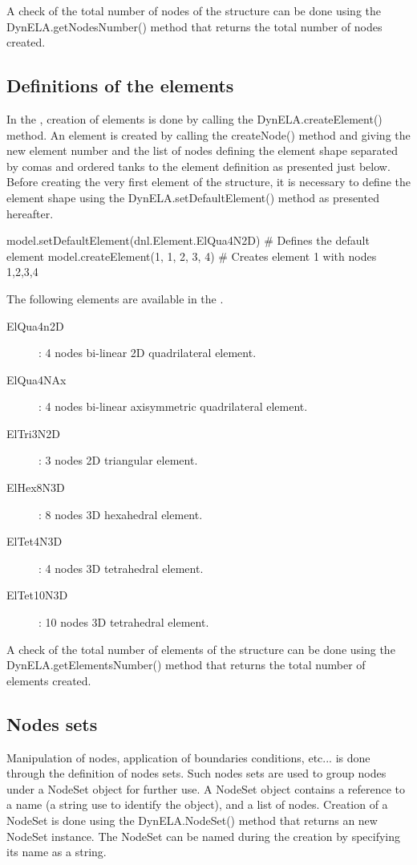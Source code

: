 A check of the total number of nodes of the structure can be done
using the \textsf{DynELA.getNodesNumber()} method that returns the
total number of nodes created.

\subsection{Definitions of the elements}

In the \Dynela, creation of elements is done by calling the \textsf{DynELA.createElement()}
method. An element is created by calling the \textsf{createNode()}
method and giving the new element number and the list of nodes defining
the element shape separated by comas and ordered tanks to the element
definition as presented just below. Before creating the very first
element of the structure, it is necessary to define the element shape
using the \textsf{DynELA.setDefaultElement()} method as presented
hereafter.

\begin{PythonListing}
model.setDefaultElement(dnl.Element.ElQua4N2D) # Defines the default element
model.createElement(1, 1, 2, 3, 4)             # Creates element 1 with nodes 1,2,3,4
\end{PythonListing}

The following elements are available in the \Dynela.
\begin{description}
\item [{ElQua4n2D}] : 4 nodes bi-linear 2D quadrilateral element.
\item [{ElQua4NAx}] : 4 nodes bi-linear axisymmetric quadrilateral element.
\item [{ElTri3N2D}] : 3 nodes 2D triangular element.
\item [{ElHex8N3D}] : 8 nodes 3D hexahedral element.
\item [{ElTet4N3D}] : 4 nodes 3D tetrahedral element.
\item [{ElTet10N3D}] : 10 nodes 3D tetrahedral element.
\end{description}
A check of the total number of elements of the structure can be done
using the \textsf{DynELA.getElementsNumber()} method that returns
the total number of elements created.

\subsection{Nodes sets}

Manipulation of nodes, application of boundaries conditions, etc...
is done through the definition of nodes sets. Such nodes sets are
used to group nodes under a \textsf{NodeSet} object for further use.
A \textsf{NodeSet} object contains a reference to a name (a string
use to identify the object), and a list of nodes. Creation of a \textsf{NodeSet}
is done using the \textsf{DynELA.NodeSet()} method that returns an
new \textsf{NodeSet} instance. The \textsf{NodeSet} can be named during
the creation by specifying its name as a string.


